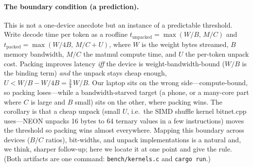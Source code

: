 \documentclass[11pt]{article}
\begin{document}
\paragraph{The boundary condition (a prediction).} This is not a one-device anecdote
but an instance of a predictable threshold. Write decode time per token as a roofline
$t_{\text{unpacked}}=\max(W/B,\,M/C)$ and $t_{\text{packed}}=\max(W/4B,\,M/C+U)$,
where $W$ is the weight bytes streamed, $B$ memory bandwidth, $M/C$ the matmul compute
time, and $U$ the per-token unpack cost. Packing improves latency \emph{iff} the
device is weight-bandwidth-bound ($W/B$ is the binding term) \emph{and} the unpack
stays cheap enough, $U < W/B - W/4B = \tfrac{3}{4}\,W/B$. Our laptop sits on the wrong
side---compute-bound, so packing loses---while a bandwidth-starved target (a phone, or
a many-core part where $C$ is large and $B$ small) sits on the other, where packing
wins. The corollary is that a cheap unpack (small $U$, i.e.\ the SIMD shuffle kernel
bitnet.cpp uses---NEON unpacks 16 bytes to 64 ternary values in a few instructions)
moves the threshold so packing wins almost everywhere. Mapping this boundary across
devices ($B/C$ ratios), bit-widths, and unpack implementations is a natural and, we
think, sharper follow-up; here we locate it at one point and give the rule. (Both
artifacts are one command: \texttt{bench/kernels.c} and \texttt{cargo run}.)
\end{document}
